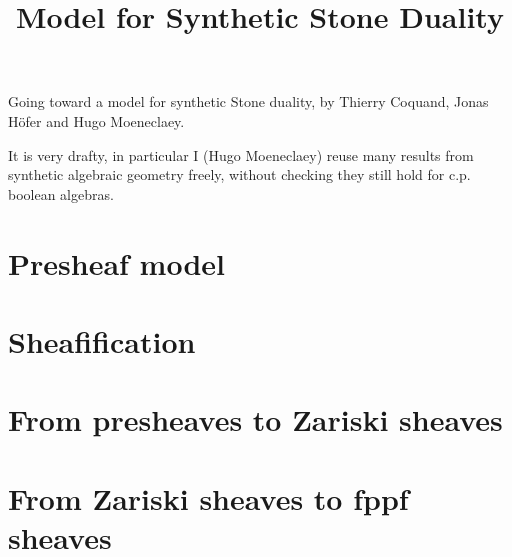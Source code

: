 \documentclass{../util/zariski}
\title{Model for Synthetic Stone Duality}
\begin{document}
\maketitle

Going toward a model for synthetic Stone duality, by Thierry Coquand, Jonas Höfer and Hugo Moeneclaey.

It is very drafty, in particular I (Hugo Moeneclaey) reuse many results from synthetic algebraic geometry freely, without checking they still hold for c.p. boolean algebras.

\tableofcontents

\section{Presheaf model}


\section{Sheafification}


\section{From presheaves to Zariski sheaves}


\section{From Zariski sheaves to fppf sheaves}




\printindex

\printbibliography
\end{document}

